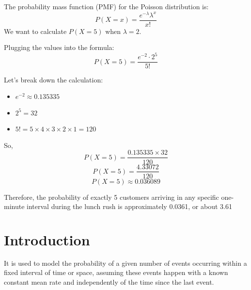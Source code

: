 \begin{eg}
  The probability mass function (PMF) for the Poisson distribution is:
  \[ P(X=x) = \frac{e^{-\lambda} \lambda^x}{x!} \]
  We want to calculate \(P(X=5)\) when \(\lambda=2\).

  Plugging the values into the formula:
  \[ P(X=5) = \frac{e^{-2} \cdot 2^5}{5!} \]

  Let's break down the calculation:
  \begin{itemize}
    \item \(e^{-2} \approx 0.135335\)
    \item \(2^5 = 32\)
    \item \(5! = 5 \times 4 \times 3 \times 2 \times 1 = 120\)
  \end{itemize}

  So,
  \[ P(X=5) = \frac{0.135335 \times 32}{120} \]
  \[ P(X=5) = \frac{4.33072}{120} \]
  \[ P(X=5) \approx 0.036089 \]

  Therefore, the probability of exactly 5 customers arriving in any specific one-minute interval during the lunch rush is approximately 0.0361, or about 3.61%
\end{eg}

\section{Introduction}
It is used to model the probability of a given number of events
occurring within a fixed interval of time or space, assuming these events happen
with a known constant mean rate and independently of the time since the last
event.

